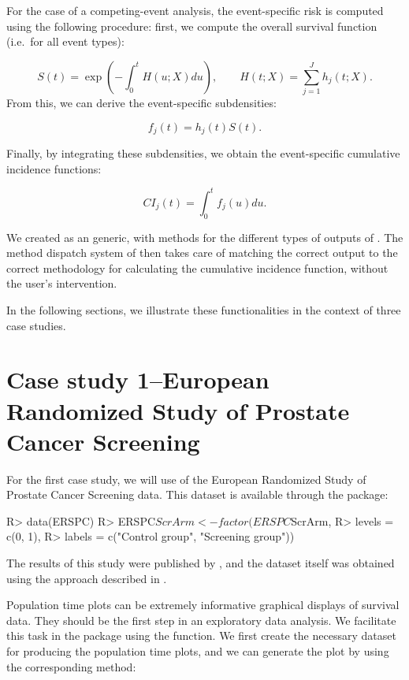 \documentclass[
]{jss}
\begin{document}
For the case of a competing-event analysis, the event-specific risk is
computed using the following procedure: first, we compute the overall
survival function (i.e.~for all event types):

\[ S(t) = \exp\left(-\int_0^t H(u;X) du\right),\qquad H(t;X) = \sum_{j=1}^J h_j(t;X).\]
From this, we can derive the event-specific subdensities:

\[ f_j(t) = h_j(t)S(t).\]

Finally, by integrating these subdensities, we obtain the event-specific
cumulative incidence functions:

\[ CI_j(t) = \int_0^t f_j(u)du.\]

We created  as an  generic, with methods for
the different types of outputs of . The method
dispatch system of  then takes care of matching the correct
output to the correct methodology for calculating the cumulative
incidence function, without the user's intervention.

In the following sections, we illustrate these functionalities in the
context of three case studies.

\hypertarget{case-study-1european-randomized-study-of-prostate-cancer-screening}{%
\section{Case study 1--European Randomized Study of Prostate Cancer
Screening}\label{case-study-1european-randomized-study-of-prostate-cancer-screening}}

For the first case study, we will use of the European Randomized Study
of Prostate Cancer Screening data. This dataset is available through the
 package:

\begin{CodeChunk}

\begin{CodeInput}
R> data(ERSPC)
R> ERSPC$ScrArm <- factor(ERSPC$ScrArm, 
R>                        levels = c(0, 1), 
R>                        labels = c("Control group", "Screening group"))
\end{CodeInput}
\end{CodeChunk}

The results of this study were published by
\citep{schroder2009screening}, and the dataset itself was obtained using
the approach described in \citep{liu2014recovering}.

Population time plots can be extremely informative graphical displays of
survival data. They should be the first step in an exploratory data
analysis. We facilitate this task in the  package using
the  function. We first create the necessary dataset for
producing the population time plots, and we can generate the plot by
using the corresponding  method:
\end{document}
